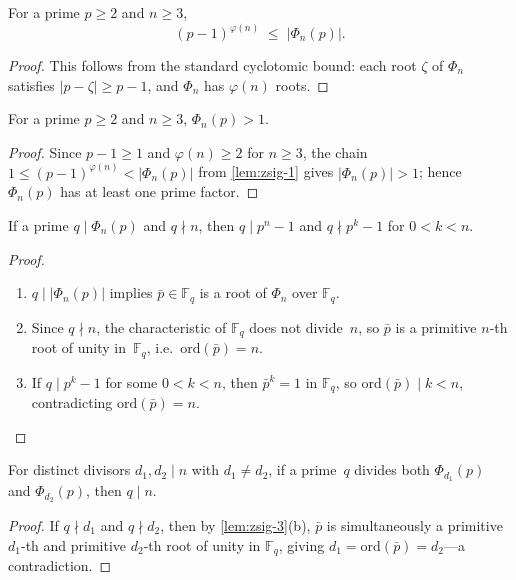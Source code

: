 \begin{lemma}\label{lem:zsig-1}
For a prime $p \ge 2$ and $n \ge 3$,
\[
  (p-1)^{\varphi(n)} \;\le\; |\Phi_n(p)|.
\]
\end{lemma}
\begin{proof}
This follows from the standard cyclotomic bound: each root $\zeta$ of $\Phi_n$
satisfies $|p - \zeta| \ge p - 1$, and $\Phi_n$ has $\varphi(n)$ roots.
\end{proof}

\begin{lemma}\label{lem:zsig-2}
For a prime $p \ge 2$ and $n \ge 3$, $\Phi_n(p) > 1$.
\end{lemma}
\begin{proof}
Since $p - 1 \ge 1$ and $\varphi(n) \ge 2$ for $n \ge 3$, the chain
$1 \le (p-1)^{\varphi(n)} < |\Phi_n(p)|$ from \cref{lem:zsig-1} gives
$|\Phi_n(p)| > 1$; hence $\Phi_n(p)$ has at least one prime factor.
\end{proof}


\begin{lemma}\label{lem:zsig-3}
If a prime $q \mid \Phi_n(p)$ and $q \nmid n$, then $q \mid p^n-1$
and $q \nmid p^k-1$ for $0 < k < n$.
\end{lemma}
\begin{proof}
\begin{enumerate}
  \item[\textbf{(3a)}] $q \mid |\Phi_n(p)|$ implies
    $\bar p \in \mathbb{F}_q$ is a root of $\Phi_n$ over $\mathbb{F}_q$.
  \item[\textbf{(3b)}] Since $q \nmid n$, the characteristic of $\mathbb{F}_q$
    does not divide~$n$, so $\bar p$ is a primitive $n$-th root of unity
    in~$\mathbb{F}_q$, i.e.\ $\mathrm{ord}(\bar p) = n$.
  \item[\textbf{(3c)}] If $q \mid p^k-1$ for some $0 < k < n$, then
    $\bar p^k = 1$ in $\mathbb{F}_q$, so $\mathrm{ord}(\bar p) \mid k < n$,
    contradicting $\mathrm{ord}(\bar p) = n$. \qedhere
\end{enumerate}
\end{proof}

\begin{lemma}\label{lem:zsig-4}
For distinct divisors $d_1, d_2 \mid n$ with $d_1 \ne d_2$, if a prime~$q$
divides both $\Phi_{d_1}(p)$ and $\Phi_{d_2}(p)$, then $q \mid n$.
\end{lemma}
\begin{proof}
If $q \nmid d_1$ and $q \nmid d_2$, then by \cref{lem:zsig-3}(b), $\bar p$ is simultaneously
a primitive $d_1$-th and primitive $d_2$-th root of unity in $\mathbb{F}_q$,
giving $d_1 = \mathrm{ord}(\bar p) = d_2$---a contradiction.
\end{proof}


